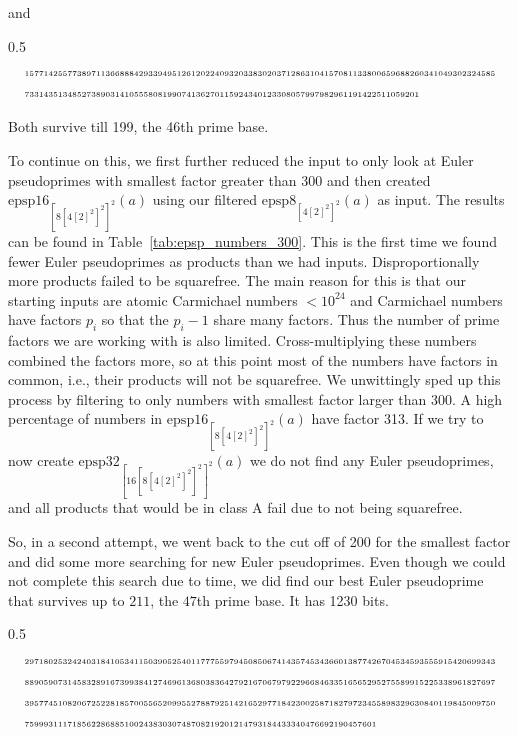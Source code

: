 \documentclass[runningheads]{amsart}
\newcommand{\epsp}{\mathrm{epsp}}
\begin{document}
{\doublespacing
and}
\begin{spacing}{0.5}
\begin{align*}
&\mbox{\tiny
157714255773897113668884293394951261202240932033830203712863104157081133800659688260341049302324585}\\
 \vspace{-5pt}
&\mbox{\tiny
73314351348527389031410555808199074136270115924340123308057997982961191422511059201}
\end{align*}
\end{spacing}

\smallskip

Both survive till 199,
the 46th prime base.

To continue on this,
we first further reduced the input to only look at Euler pseudoprimes with smallest
factor greater than 300 and then created
$\epsp16_{[8[4[2]^2]^2]^2}(a)$
using our filtered
$\epsp8_{[4[2]^2]^2}(a)$
as input.
The results can be found in
Table~\ref{tab:epsp_numbers_300}.
This is the first time we found fewer Euler pseudoprimes as products than we had inputs.
Disproportionally more products failed to be squarefree.
The main reason for this is that our starting inputs are atomic Carmichael numbers
$<10^{24}$
and Carmichael numbers have factors
$p_i$
so that the
$p_i
-1$ share many factors.
Thus the number of prime factors we are working with is also limited.
Cross-multiplying these numbers combined the factors more,
so at this point most of the numbers have factors in common,
i.e.,
their products will not be squarefree.
We unwittingly sped up this process by filtering to only numbers with smallest factor
larger than $300$.
A high percentage of numbers in
$\epsp16_{[8[4[2]^2]^2]^2}(a)$
have factor 313.
If we try to now create
$\epsp32_{[16[8[4[2]^2]^2]^2]^2}(a)$
we do not find any Euler pseudoprimes,
and all products that would be in class A fail due to not being squarefree.

So,
in a second attempt,
we went back to the cut off of 200 for the smallest factor and did some more searching
for new Euler pseudoprimes.
Even though we could not complete this search due to time,
we did find our best Euler pseudoprime that survives up to $211$,
the $47$th prime base.
It has 1230 bits.

\begin{spacing}{0.5}
\begin{align*}
&\mbox{\tiny
297180253242403184105341150390525401177755979450850674143574534366013877426704534593555915420699343}\\
 \vspace{-5pt}
&\mbox{\tiny
889059073145832891673993841274696136803836427921670679792296684633516565295275589915225338961827697}
\\
 \vspace{-5pt}
&\mbox{\tiny
395774510820672522818570055652099552788792514216529771842300258718279723455898329630840119845009750}
\\
 \vspace{-5pt}
&\mbox{\tiny
75999311171856228688510024383030748708219201214793184433340476692190457601}
\end{align*}
\end{spacing}
\end{document}
